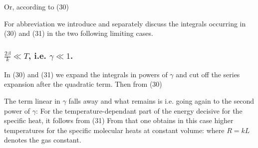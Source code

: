 \begin{paper}{1}
Or, according to (30)

For abbreviation we introduce
and separately discuss the integrals occurring in (30) and (31) in the two following limiting cases.

\subsubsection{$\frac{2\beta}{k}\ll T$, i.e. $\gamma\ll 1$.} In (30) and (31) we expand the integrals in powers of $\gamma$ and cut off the series expansion after the quadratic term. Then from (30)

The term linear in $\gamma$ falls away and what remains is
i.e. going again to the second power of $\gamma$:
For the temperature-dependant part of the energy decisive for the specific heat, it follows from (31)
From that one obtains in this case higher temperatures for the specific molecular heats at constant volume:
where $R=kL$ denotes the gas constant.


\end{paper}
